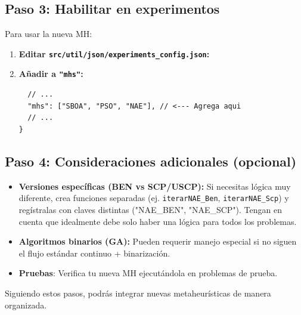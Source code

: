 \subsection{Paso 3: Habilitar en experimentos}

Para usar la nueva MH:

\begin{enumerate}
    \item \textbf{Editar \texttt{src/util/json/experiments\_config.json}:}
    \item \textbf{Añadir a \texttt{"mhs"}:}
        \begin{lstlisting}
  // ...
  "mhs": ["SBOA", "PSO", "NAE"], // <--- Agrega aqui
  // ...
}
        \end{lstlisting}
\end{enumerate}

\subsection{Paso 4: Consideraciones adicionales (opcional)}

\begin{itemize}
    \item \textbf{Versiones específicas (BEN vs SCP/USCP):} Si necesitas lógica muy diferente, crea funciones separadas (ej. \texttt{iterarNAE\_Ben}, \texttt{iterarNAE\_Scp}) y regístralas con claves distintas ("NAE\_BEN", "NAE\_SCP"). Tengan en cuenta que idealmente debe solo haber una lógica para todos los problemas.
    \item \textbf{Algoritmos binarios (GA):} Pueden requerir manejo especial si no siguen el flujo estándar continuo + binarización.
    \item \textbf{Pruebas}: Verifica tu nueva MH ejecutándola en problemas de prueba.
\end{itemize}
Siguiendo estos pasos, podrás integrar nuevas metaheurísticas de manera organizada.

